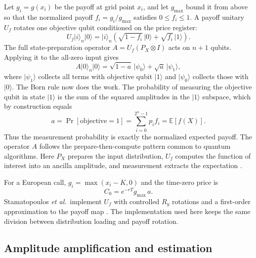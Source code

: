 \documentclass[12pt]{article}
\begin{document}
Let $g_i=g(x_i)$ be the payoff at grid point $x_i$, and let $g_{\max}$ bound it from above so that the normalized payoff $f_i = g_i/g_{\max}$ satisfies $0\le f_i\le 1$.  A payoff unitary $U_f$ rotates one objective qubit conditioned on the price register:
\begin{equation}
    U_f\lvert i\rangle_n\lvert 0\rangle
    =
    \lvert i\rangle_n
    \left(
        \sqrt{1-f_i}\,\lvert 0\rangle
        +
        \sqrt{f_i}\,\lvert 1\rangle
    \right).
    \label{eq:payoff-loading}
\end{equation}
The full state-preparation operator $A = U_f(P_X\otimes I)$ acts on $n+1$ qubits.  Applying it to the all-zero input gives
\begin{equation}
    A\lvert 0\rangle_n\lvert 0\rangle
    =
    \sqrt{1-a}\,\lvert \psi_0\rangle
    +
    \sqrt{a}\,\lvert \psi_1\rangle,
    \label{eq:a-good-bad}
\end{equation}
where $\lvert \psi_1\rangle$ collects all terms with objective qubit $\lvert 1\rangle$ and $\lvert \psi_0\rangle$ collects those with $\lvert 0\rangle$.  The Born rule now does the work.  The probability of measuring the objective qubit in state $\lvert 1\rangle$ is the sum of the squared amplitudes in the $\lvert 1\rangle$ subspace, which by construction equals
\begin{equation}
    a
    =
    \Pr[\text{objective}=1]
    =
    \sum_{i=0}^{2^n-1} p_i f_i
    =
    \mathbb{E}[f(X)].
    \label{eq:amplitude-expectation}
\end{equation}
Thus the measurement probability is exactly the normalized expected payoff.  The operator $A$ follows the prepare-then-compute pattern common to quantum algorithms.  Here $P_X$ prepares the input distribution, $U_f$ computes the function of interest into an ancilla amplitude, and measurement extracts the expectation \cite{rebentrostQuantumComputationalFinance2018,stamatopoulosOptionPricingUsing2020}.

For a European call, $g_i=\max(x_i-K,0)$ and the time-zero price is
\begin{equation}
    C_0 = e^{-rT}g_{\max}\,a.
    \label{eq:european-amplitude-price}
\end{equation}
Stamatopoulos \textit{et al.}\ implement $U_f$ with controlled $R_y$ rotations and a first-order approximation to the payoff map \cite{stamatopoulosOptionPricingUsing2020}.  The implementation used here keeps the same division between distribution loading and payoff rotation.

\subsection{Amplitude amplification and estimation}
\end{document}
